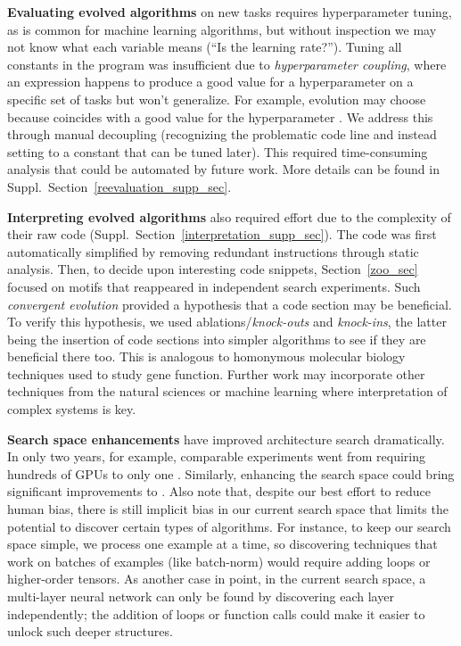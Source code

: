 \textbf{Evaluating evolved algorithms} on new tasks requires hyperparameter tuning, as is common for machine learning algorithms, but without inspection we may not know what each variable means (\eg ``Is  the learning rate?''). Tuning all constants in the program was insufficient due to \textit{hyperparameter coupling}, where an expression happens to produce a good value for a hyperparameter on a specific set of tasks but won't generalize. For example, evolution may choose  because  coincides with a good value for the hyperparameter . We address this through manual decoupling (\eg recognizing the problematic code line and instead setting  to a constant that can be tuned later). This required time-consuming analysis that could be automated by future work. More details can be found in Suppl.\  Section~\ref{reevaluation_supp_sec}. 

\textbf{Interpreting evolved algorithms} also required effort due to the complexity of their raw code (Suppl.\  Section~\ref{interpretation_supp_sec}). The code was first automatically simplified by removing redundant instructions through static analysis. Then, to decide upon interesting code snippets, Section~\ref{zoo_sec} focused on motifs that reappeared in independent search experiments. Such \emph{convergent evolution} provided a hypothesis that a code section may be beneficial. To verify this hypothesis, we used ablations/\emph{knock-outs} and \emph{knock-ins}, the latter being the insertion of code sections into simpler algorithms to see if they are beneficial there too. This is analogous to homonymous molecular biology techniques used to study gene function. Further work may incorporate other techniques from the natural sciences or machine learning where interpretation of complex systems is key.

\textbf{Search space enhancements} have improved architecture search dramatically. In only two years, for example, comparable experiments went from requiring hundreds of GPUs \cite{zoph2017learning} to only one \cite{liu2018darts}. Similarly, enhancing the search space could bring significant improvements to \amlz. Also note that, despite our best effort to reduce human bias, there is still implicit bias in our current search space that limits the potential to discover certain types of algorithms. For instance, to keep our search space simple, we process one example at a time, so discovering techniques that work on batches of examples (like batch-norm) would require adding loops or higher-order tensors. As another case in point, in the current search space, a multi-layer neural network can only be found by discovering each layer independently; the addition of loops or function calls could make it easier to unlock such deeper structures. 
